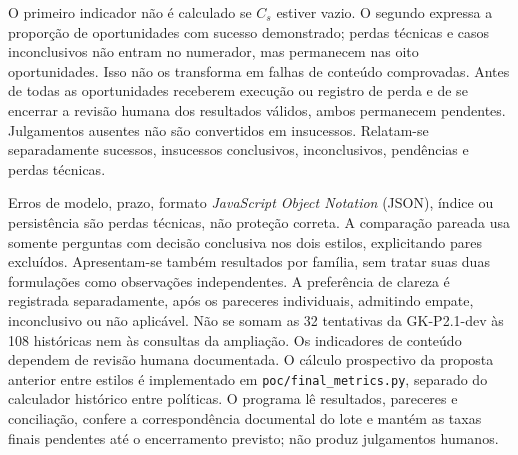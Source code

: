 O primeiro indicador não é calculado se $C_s$ estiver vazio. O segundo expressa a proporção de oportunidades com sucesso demonstrado; perdas técnicas e casos inconclusivos não entram no numerador, mas permanecem nas oito oportunidades. Isso não os transforma em falhas de conteúdo comprovadas. Antes de todas as oportunidades receberem execução ou registro de perda e de se encerrar a revisão humana dos resultados válidos, ambos permanecem pendentes. Julgamentos ausentes não são convertidos em insucessos. Relatam-se separadamente sucessos, insucessos conclusivos, inconclusivos, pendências e perdas técnicas.

Erros de modelo, prazo, formato \textit{JavaScript Object Notation} (JSON), índice ou persistência são perdas técnicas, não proteção correta. A comparação pareada usa somente perguntas com decisão conclusiva nos dois estilos, explicitando pares excluídos. Apresentam-se também resultados por família, sem tratar suas duas formulações como observações independentes. A preferência de clareza é registrada separadamente, após os pareceres individuais, admitindo empate, inconclusivo ou não aplicável. Não se somam as 32 tentativas da GK-P2.1-dev às 108 históricas nem às consultas da ampliação. Os indicadores de conteúdo dependem de revisão humana documentada. O cálculo prospectivo da proposta anterior entre estilos é implementado em \nolinkurl{poc/final_metrics.py}, separado do calculador histórico entre políticas. O programa lê resultados, pareceres e conciliação, confere a correspondência documental do lote e mantém as taxas finais pendentes até o encerramento previsto; não produz julgamentos humanos.
